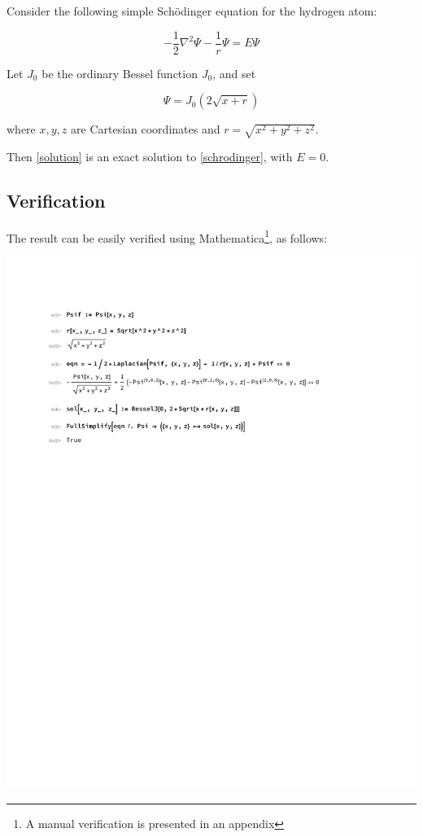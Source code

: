 \documentclass{article}
\begin{document}
Consider the following simple Sch\"odinger equation for the hydrogen atom:

\begin{equation}
\label{schrodinger}
-\frac{1}{2}\nabla^2 \Psi - \frac{1}{r}\Psi = E \Psi
\end{equation}

Let $J_0$ be the ordinary Bessel function $J_0$, and set

\begin{equation}
\label{solution}
\Psi = J_0(2\sqrt{x+r})
\end{equation}

where $x,y,z$ are Cartesian coordinates and $r=\sqrt{x^2+y^2+z^2}$.

\vskip 12pt

Then \eqref{solution} is an exact solution to \eqref{schrodinger}, with $E=0$.

\subsection*{Verification}

The result can be easily verified using Mathematica\footnote{A manual verification is presented in an appendix}, as follows:

\includegraphics[page=1, clip, trim=1in 7in 1in 1in, width=\textwidth]{improved.pdf}
\end{document}
